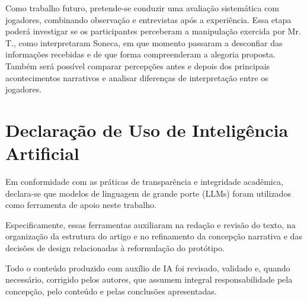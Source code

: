 \documentclass[12pt]{article}
\begin{document}
Como trabalho futuro, pretende-se conduzir uma avaliação sistemática com jogadores, combinando observação e entrevistas após a experiência. Essa etapa poderá investigar se os participantes perceberam a manipulação exercida por Mr. T., como interpretaram Soneca, em que momento passaram a desconfiar das informações recebidas e de que forma compreenderam a alegoria proposta. Também será possível comparar percepções antes e depois dos principais acontecimentos narrativos e analisar diferenças de interpretação entre os jogadores.

\section*{Declaração de Uso de Inteligência Artificial}
Em conformidade com as práticas de transparência e integridade acadêmica, declara-se que modelos de linguagem de grande porte (LLMs) foram utilizados como ferramenta de apoio neste trabalho.

Especificamente, essas ferramentas auxiliaram na redação e revisão do texto, na organização da estrutura do artigo e no refinamento da concepção narrativa e das decisões de design relacionadas à reformulação do protótipo.

Todo o conteúdo produzido com auxílio de IA foi revisado, validado e, quando necessário, corrigido pelos autores, que assumem integral responsabilidade pela concepção, pelo conteúdo e pelas conclusões apresentadas.



\end{document}
